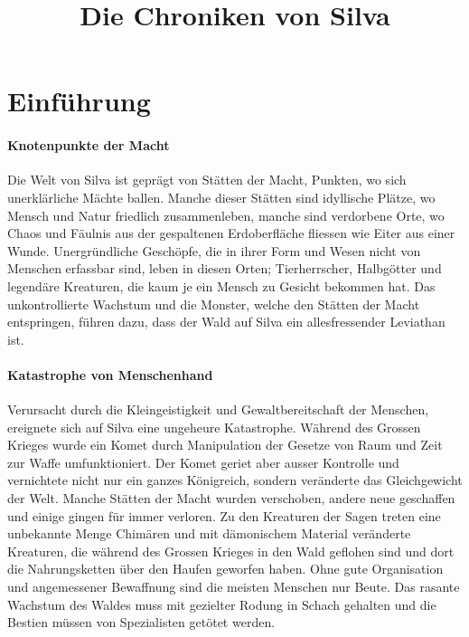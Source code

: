\documentclass[10pt,twoside,twocolumn,openany]{book}
\title{Die Chroniken von Silva}
\begin{document}
\tableofcontents

\chapter{Einführung}
\subsubsection{Knotenpunkte der Macht} Die Welt von Silva ist geprägt von Stätten der Macht, Punkten, wo sich unerklärliche Mächte ballen. Manche dieser Stätten sind idyllische Plätze, wo Mensch und Natur friedlich zusammenleben, manche sind verdorbene Orte, wo Chaos und Fäulnis aus der gespaltenen Erdoberfläche fliessen wie Eiter aus einer Wunde. Unergründliche Geschöpfe, die in ihrer Form und Wesen nicht von Menschen erfassbar sind, leben in diesen Orten; Tierherrscher, Halbgötter und legendäre Kreaturen, die kaum je ein Mensch zu Gesicht bekommen hat. Das unkontrollierte Wachstum und die Monster, welche den Stätten der Macht entspringen, führen dazu, dass der Wald auf Silva ein allesfressender Leviathan ist.
	
\subsubsection{Katastrophe von Menschenhand} Verursacht durch die Kleingeistigkeit und Gewaltbereitschaft der Menschen, ereignete sich auf Silva eine ungeheure Katastrophe. Während des Grossen Krieges wurde ein Komet durch Manipulation der Gesetze von Raum und Zeit zur Waffe umfunktioniert. Der Komet geriet aber ausser Kontrolle und vernichtete nicht nur ein ganzes Königreich, sondern veränderte das Gleichgewicht der Welt. Manche Stätten der Macht wurden verschoben, andere neue geschaffen und einige gingen für immer verloren. Zu den Kreaturen der Sagen treten eine unbekannte Menge Chimären und mit dämonischem Material veränderte Kreaturen, die während des Grossen Krieges in den Wald geflohen sind und dort die Nahrungsketten über den Haufen geworfen haben. Ohne gute Organisation und angemessener Bewaffnung sind die meisten Menschen nur Beute. Das rasante Wachstum des Waldes muss mit gezielter Rodung in Schach gehalten und die Bestien müssen von Spezialisten getötet werden.

\end{document}
